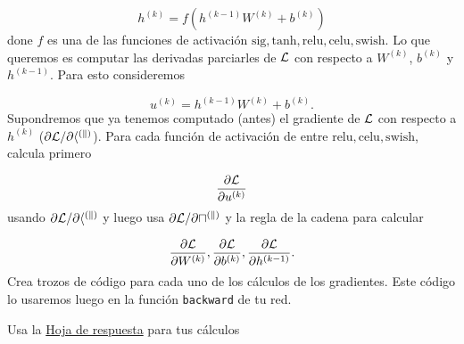 \documentclass[11pt]{article}
\begin{document}
\begin{equation}
h^{(k)} = f(h^{(k-1)}W^{(k)}+b^{(k)})
\end{equation} done \(f\) es una de las funciones de activación
\(\text{sig}, \text{tanh}, \text{relu}, \text{celu}, \text{swish}\). Lo
que queremos es computar las derivadas parciarles de \(\cal L\) con
respecto a \(W^{(k)}\), \(b^{(k)}\) y \(h^{(k-1)}\). Para esto
consideremos

\begin{equation}
u^{(k)}=h^{(k-1)}W^{(k)}+b^{(k)}.
\end{equation} Supondremos que ya tenemos computado (antes) el gradiente
de \(\cal L\) con respecto a \(h^{(k)}\)
(\(\partial \cal L/\partial h^{(k)}\)). Para cada función de activación
de entre \(\text{relu}, \text{celu}, \text{swish}\), calcula primero

\begin{equation}
\frac{\partial \cal L}{\partial u^{(k)}}
\end{equation} usando \(\partial \cal L/\partial h^{(k)}\) y luego usa
\(\partial \cal L/\partial u^{(k)}\) y la regla de la cadena para
calcular

\begin{equation}
\frac{\partial \cal L}{\partial W^{(k)}}, \frac{\partial \cal L}{\partial b^{(k)}}, \frac{\partial \cal L}{\partial h^{(k-1)}}. 
\end{equation} Crea trozos de código para cada uno de los cálculos de
los gradientes. Este código lo usaremos luego en la función
\texttt{backward} de tu red.

Usa la
\href{https://colab.research.google.com/drive/1a44G8JIfuaAXmare28dCDT1gvUV1CuDP}{Hoja
de respuesta} para tus cálculos
\end{document}

